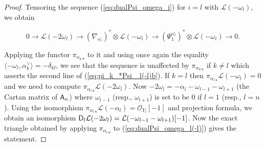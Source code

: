 \documentclass[sn-mathphys-num]{sn-jnl}%
\newcommand{\Oo}{\mathcal O}
\newcommand{\Ll}{\mathcal L}
\theoremstyle{definition}
\begin{document}
\begin{proof}
Tensoring the sequence (\ref{eq:dualPsi_omega_i}) for $i=l$ with $\Ll (-\omega _l)$, we obtain 

\begin{equation}\label{eq:dualPsi_omega_l(-l)}
0\rightarrow \Ll (-2\omega _l)\rightarrow (\nabla _{\omega _l})^{\ast}\otimes \Ll (-\omega _l)\rightarrow (\Psi _1^{\omega _l})^{\ast}\otimes \Ll (-\omega _l)\rightarrow 0.
\end{equation}

Applying the functor ${\pi _{\alpha _k}}_{\ast}$ to it and using once again the equality $\langle -\omega _l,\alpha _k^{\vee}\rangle =-\delta _{kl}$, we see that the sequence is unaffected by ${\pi _{\alpha _k}}_{\ast}$ if $k\neq l$ which asserts the second line of (\ref{eq:pi_k_*Psi _l(-l)b}). If $k=l$ then ${\pi _{\alpha _l}}_{\ast}\Ll (-\omega _l)=0$ and we need to compute ${\pi _{\alpha _l}}_{\ast}\Ll (-2\omega _l)$. Now $-2\omega _l=
-\alpha _l-\omega _{l-1}-\omega _{l+1}$ (the Cartan matrix of ${\sf A}_n$) where $\omega _{l-1}$ (resp., $\omega _{l+1}$) is set to be $0$ if $l=1$ (resp., $l=n$). Using the isomorphism ${\pi _{\alpha _l}}_{\ast}\Ll (-\alpha _l)=\Oo _{Y_l}[-1]$ and projection formula, we obtain an isomorphism ${\sf D}_l\Ll (-2\omega _l)=\Ll (-\omega _{l-1}-\omega _{l+1})[-1]$. Now the exact triangle obtained by applying ${\pi _{\alpha _l}}_{\ast}$ to (\ref{eq:dualPsi_omega_l(-l)}) gives the statement.
\end{proof}
\end{document}
